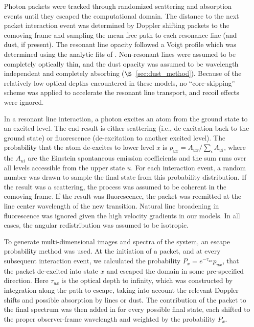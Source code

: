 \documentclass[12pt,preprint]{aastex}
\begin{document}
Photon packets were tracked through randomized scattering and
absorption events until they escaped the computational domain.  The
distance to the next packet interaction event was determined by
Doppler shifting packets to the comoving frame and sampling the mean
free path to each resonance line (and dust, if present).  The resonant
line opacity followed a Voigt profile which was determined using the
analytic fits of  \cite{Tomi_2006}.      Non-resonant lines were
assumed to be completely optically thin, and the dust opacity was
assumed to be wavelength independent and completely absorbing
($\S$~\ref{sec:dust_method}).
Because of the relatively low optical depths encountered in
these models, no ``core-skipping'' scheme was applied to accelerate
the resonant line transport,  and recoil effects were ignored. 

In a resonant line interaction, a photon excites an atom from the
ground state to an excited level.  The end result is either scattering
(i.e., de-excitation back to the ground state) or fluorescence
(de-excitation to another excited  level).  The probability that the
atom de-excites to lower level $x$ is  $p_{ux} = A_{ux} / \sum_i A_{ui}$, where the $A_{ui}$ are the Einstein spontaneous emission coefficients and the sum runs over all levels accessible from the upper state $u$.  
For each interaction event, a random number was drawn to sample the
final state from this probability distribution.    If the result was a
scattering, the process was assumed to be coherent in the comoving
frame.  If the result was fluorescence, the packet was  reemitted at
the line center wavelength of the new transition.  Natural line
broadening in fluorescence was ignored given the high velocity
gradients in our models.  In all cases, the angular redistribution was
assumed to be isotropic. 

To generate multi-dimensional images and spectra of the system, an escape probability method was used.  At the initiation of a packet, and at every subsequent interaction event, we calculated the probability $P_x = e^{-\tau_{ux}} p_{ux}$,  that the packet de-excited into state $x$ and escaped the domain in some pre-specified direction. Here
$\tau_{ux}$ is the optical depth to infinity, which was  constructed
by integration along the path to escape, taking into account the
relevant Doppler shifts and possible absorption by lines or dust.  The
contribution of the packet to the final spectrum was then added in for
every possible final state, each shifted to the proper observer-frame
wavelength and weighted by the probability $P_x$. 
\end{document}
